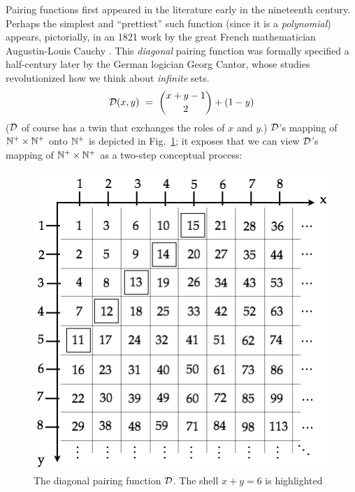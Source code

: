 \medskip

 
Pairing functions first appeared in the literature early in the nineteenth century.  Perhaps the simplest and ``prettiest'' such function (since it is a {\em polynomial}) appears, pictorially, in an 1821 work by the great French mathematician Augustin-Louis Cauchy \cite{Cauchy21}.  This {\em diagonal} pairing function was formally specified a half-century later by the German logician Georg Cantor, whose studies \cite{Cantor74,Cantor78} revolutionized how we think about {\em infinite} sets.
\begin{equation}
\label{eq:diag}
\mbox{$\cal D$}(x, y) \ = \
{{x+y-1} \choose 2} + (1-y)
\end{equation}
($\mbox{$\cal D$}$ of course has a twin that exchanges the roles of $x$ and $y$.)  $\mbox{$\cal D$}$'s mapping of $\mathbb{N}^+ \times \mathbb{N}^+$ onto $\mathbb{N}^+$ is depicted in Fig.~\ref{fig:diag}; it exposes that we can view $\mbox{$\cal D$}$'s mapping of $\mathbb{N}^+ \times \mathbb{N}^+$ as a two-step conceptual process:
\begin{figure}[htb]
\begin{center}
      \includegraphics[scale=0.4]{FiguresArithmetic/PairingDiagonal}
\end{center}
\caption{The diagonal pairing function $\mbox{$\cal D$}$.  The shell $x+y = 6$ is highlighted}
\label{fig:diag}
\end{figure}
